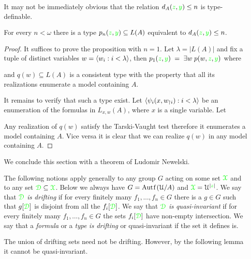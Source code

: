 \documentclass[creche.tex]{subfiles}
\begin{document}
It may not be immediately obvious that the relation $d_A({\color{green} z},{\color{green} y})\le n$ is type-definable. 

\begin{proposition}\label{prop_Lascar_distance_type_def}
For every $n<\omega$ there is a type $p_n({\color{green} z},{\color{green} y})\subseteq L(A)$ equivalent to $d_A({\color{green} z},{\color{green} y})\le n$.  
\end{proposition}
\begin{proof}
It suffices to prove the proposition with $n=1$. Let $\lambda=|L(A)|$ and fix a tuple of distinct variables $w=\langle w_i:i<\lambda\rangle$, then $p_1({\color{green} z},{\color{green} y})\;=\;\exists w\;p(w,{\color{green} z},{\color{green} y})$ where


and $q(w)\subseteq L(A)$ is a consistent type with the property that all its realizations enumerate a model containing $A$.

It remains to verify that such a type exist. Let $\langle\psi_i(x,w_{\restriction i}):i<\lambda\rangle$ be an enumeration of the formulas in $L_{x,w}(A)$, where $x$ is a single variable. Let 


Any realization of $q(w)$ satisfy the Tarski-Vaught test therefore it enumerates a model containing $A$. Vice versa it is clear that we can realize $q(w)$ in any model containing $A$.
\end{proof}

We conclude this section with a theorem of Ludomir Newelski. 

The following notions apply generally to any group $G$ acting on some set ${\color{green}\EuScript X}$ and to any set ${\color{green}\EuScript D}\subseteq {\color{green}\EuScript X}$. Below we always have $G=\mathord{\rm Aut\kern.15ex{f}\kern.15ex}(\EuScript U/A)$ and ${\color{green}\EuScript X}=\EuScript U^{|{\color{green} z}|}$.  We say that ${\color{green}\EuScript D}$ \emph{is drifting\/} if for every finitely many $f_1,\dots,f_n\in G$ there is a $g\in G$ such that $g[{\color{green}\EuScript D}]$ is disjoint from all the $f_i[{\color{green}\EuScript D}]$. We say that ${\color{green}\EuScript D}$ \emph{is quasi-invariant\/} if for every finitely many $f_1,\dots,f_n\in G$ the sets  $f_i[{\color{green}\EuScript D}]$ have non-empty intersection. We say that a \emph{formula\/} or a \emph{type is drifting\/} or quasi-invariant if the set it defines is.

The union of drifting sets need not be drifting. However, by the following lemma it cannot be quasi-invariant.
\end{document}
